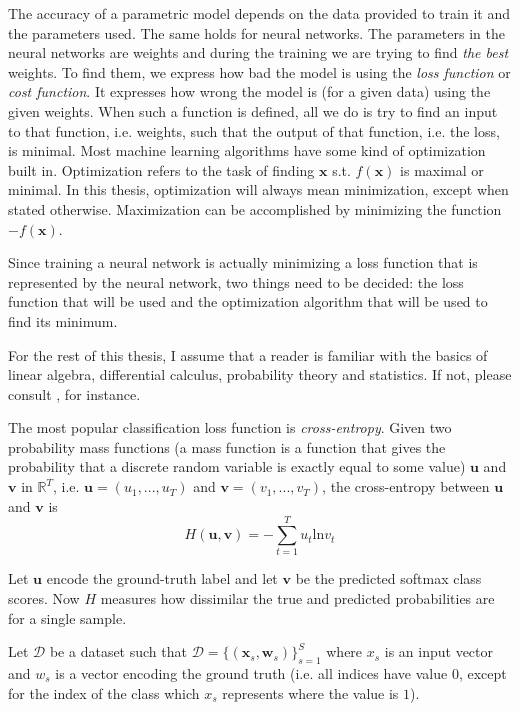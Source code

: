 The accuracy of a parametric model depends on the data provided to train it and the parameters used. The same holds for neural networks. The parameters in the neural networks are weights and during the training we are trying to find \textit{the best} weights. To find them, we express how bad the model is using the \textit{loss function} or \textit{cost function}. It expresses how wrong the model is (for a given data) using the given weights. When such a function is defined, all we do is try to find an input to that function, i.e. weights, such that the output of that function, i.e. the loss, is minimal. Most machine learning algorithms have some kind of optimization built in. Optimization refers to the task of finding $\pmb x$ s.t. $f(\pmb x)$ is maximal or minimal. In this thesis, optimization will always mean minimization, except when stated otherwise. Maximization can be accomplished by minimizing the function $-f(\pmb x)$.

Since training a neural network is actually minimizing a loss function that is represented by the neural network, two things need to be decided: the loss function that will be used and the optimization algorithm that will be used to find its minimum.

For the rest of this thesis, I assume that a reader is familiar with the basics of linear algebra, differential calculus, probability theory and statistics. If not, please consult \cite{Goodfellow-et-al-2016}, for instance.

The most popular classification loss function is \textit{cross-entropy}. Given two probability mass functions (a mass function is a function that gives the probability that a discrete random variable is exactly equal to some value) $\pmb u$ and $\pmb v$ in $\mathbb{R}^T$, i.e. $\pmb u = (u_1, ..., u_T)$ and $\pmb v =  (v_1, ..., v_T)$, the cross-entropy between $\pmb u$ and $\pmb v$ is
 \begin{equation}
H (\pmb u, \pmb v)= - \sum_{t=1}^T  u_t  \text{ln} v_t 
\end{equation}

Let $\pmb u$ encode the ground-truth label and let $\pmb v$ be the predicted softmax class scores. Now $H$ measures how dissimilar the true and predicted probabilities are for a single sample.

Let $\mathcal{D}$ be a dataset such that
$ \mathcal{D} = \{ (\pmb x_s, \pmb w_s)\}_{s=1}^{S}$ where $x_s$ is an input vector and $w_s$ is a vector encoding the ground truth (i.e. all indices have value $0$, except for the index of the class which $x_s$ represents where the value is $1$).

